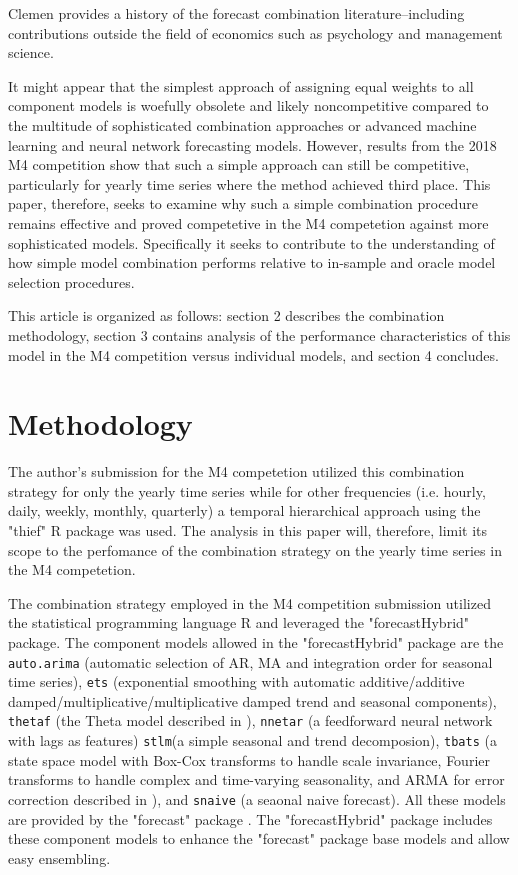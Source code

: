 \documentclass[11pt,3p,review,authoryear]{elsarticle}
\begin{document}
Clemen \cite{CLEMEN1988} provides a history of the forecast combination literature--including contributions outside the field of economics such as psychology and management science.

It might appear that the simplest approach of assigning equal weights to all component models is woefully obsolete and likely noncompetitive compared to the multitude of sophisticated combination approaches or advanced machine learning and neural network forecasting models. However, results from the 2018 M4 competition \citep{M4} show that such a simple approach can still be competitive, particularly for yearly time series where the method achieved third place. This paper, therefore, seeks to examine why such a simple combination procedure remains effective and proved competetive in the M4 competetion against more sophisticated models. Specifically it seeks to contribute to the understanding of how simple model combination performs relative to in-sample and oracle model selection procedures.


This article is organized as follows: section 2 describes the combination methodology, section 3 contains analysis of the performance characteristics of this model in the M4 competition versus individual models, and section 4 concludes.


\section{Methodology}
The author's submission for the M4 competetion utilized this combination strategy for only the yearly time series while for other frequencies (i.e. hourly, daily, weekly, monthly, quarterly) a temporal hierarchical approach using the "thief" R package \citep{ATHANASOPOULOS201760} was used. The analysis in this paper will, therefore, limit its scope to the perfomance of the combination strategy on the yearly time series in the M4 competetion.


The combination strategy employed in the M4 competition submission utilized the statistical programming language R \citep{Rlang} and leveraged the "forecastHybrid" \citep{forecastHybrid} package. The component models allowed in the "forecastHybrid" package are the  \lstinline{auto.arima} (automatic selection of AR, MA and integration order for seasonal time series), \lstinline{ets} (exponential smoothing with automatic additive/additive damped/multiplicative/multiplicative damped trend and seasonal components), \lstinline{thetaf} (the Theta model described in \citep{THETA}), \lstinline{nnetar} (a feedforward neural network with lags as features) \lstinline{stlm}(a simple seasonal and trend decomposion), \lstinline{tbats} (a state space model with Box-Cox transforms to handle scale invariance, Fourier transforms to handle complex and time-varying seasonality, and ARMA for error correction described in \citep{TBATS}), and \lstinline{snaive} (a seaonal naive forecast). All these models are provided by the "forecast" package \citep{Forecast}. The "forecastHybrid" package includes these component models to enhance the "forecast" package base models and allow easy ensembling.
\end{document}
